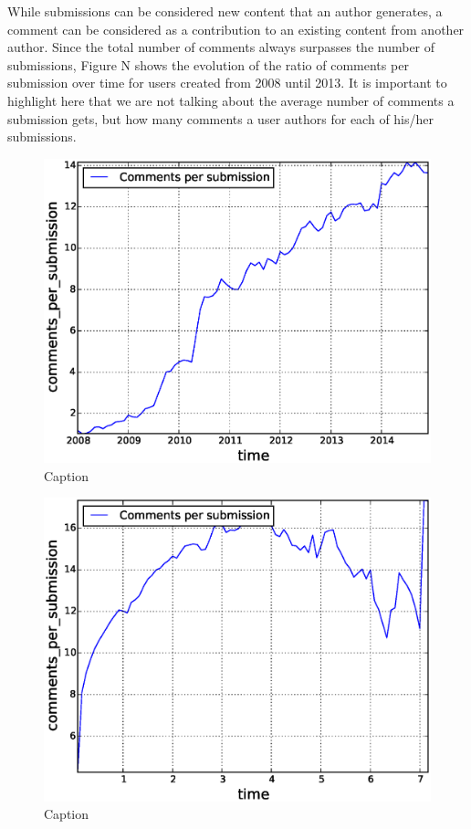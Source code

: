 While submissions can be considered new content that an author generates, a comment can be considered as a contribution to an existing content from another author. Since the total number of comments always surpasses the number of submissions, Figure N shows the evolution of the ratio of comments per submission over time for users created from 2008 until 2013. It is important to highlight here that we are not talking about the average number of comments a submission gets, but how many comments a user authors for each of his/her submissions.

\begin{figure}[!tb]
\centering
\includegraphics[scale=0.4]{./images/comments_per_submissions_over_time_total.eps}
\caption{Caption}
\label{fig:comments_per_submissions_over_time_total}
\end{figure}

\begin{figure}[!tb]
\centering
\includegraphics[scale=0.4]{./images/comments_per_submissions_user_ref_total.eps}
\caption{Caption}
\label{fig:comments_per_submissions_user_ref_total}
\end{figure}

